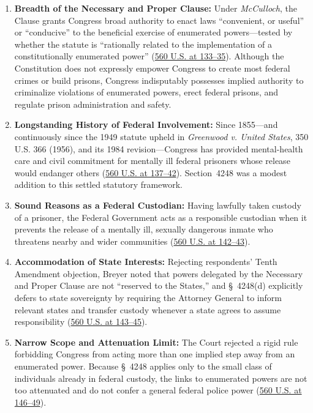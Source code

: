 \documentclass[12pt]{article}
\begin{document}
\begin{enumerate}
  \item \textbf{Breadth of the Necessary and Proper Clause:} Under \textit{McCulloch}, the Clause grants Congress broad authority to enact laws ``convenient, or useful'' or ``conducive'' to the beneficial exercise of enumerated powers---tested by whether the statute is ``rationally related to the implementation of a constitutionally enumerated power'' (\href{https://supreme.justia.com/cases/federal/us/560/126/}{560 U.S. at 133--35}). Although the Constitution does not expressly empower Congress to create most federal crimes or build prisons, Congress indisputably possesses implied authority to criminalize violations of enumerated powers, erect federal prisons, and regulate prison administration and safety.
  \item \textbf{Longstanding History of Federal Involvement:} Since 1855---and continuously since the 1949 statute upheld in \textit{Greenwood v. United States}, 350 U.S. 366 (1956), and its 1984 revision---Congress has provided mental-health care and civil commitment for mentally ill federal prisoners whose release would endanger others (\href{https://www.law.cornell.edu/supct/html/08-1224.ZO.html}{560 U.S. at 137--42}). Section~4248 was a modest addition to this settled statutory framework.
  \item \textbf{Sound Reasons as a Federal Custodian:} Having lawfully taken custody of a prisoner, the Federal Government acts as a responsible custodian when it prevents the release of a mentally ill, sexually dangerous inmate who threatens nearby and wider communities (\href{https://supreme.justia.com/cases/federal/us/560/126/}{560 U.S. at 142--43}).
  \item \textbf{Accommodation of State Interests:} Rejecting respondents' Tenth Amendment objection, Breyer noted that powers delegated by the Necessary and Proper Clause are not ``reserved to the States,'' and \S~4248(d) explicitly defers to state sovereignty by requiring the Attorney General to inform relevant states and transfer custody whenever a state agrees to assume responsibility (\href{https://supreme.justia.com/cases/federal/us/560/126/}{560 U.S. at 143--45}).
  \item \textbf{Narrow Scope and Attenuation Limit:} The Court rejected a rigid rule forbidding Congress from acting more than one implied step away from an enumerated power. Because \S~4248 applies only to the small class of individuals already in federal custody, the links to enumerated powers are not too attenuated and do not confer a general federal police power (\href{https://www.law.cornell.edu/supremecourt/text/08-1224}{560 U.S. at 146--49}).
\end{enumerate}
\end{document}
